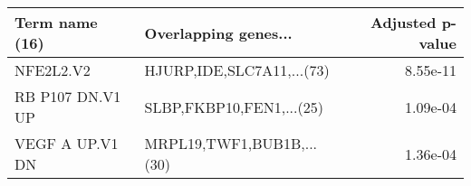 \begin{tabular}{llr}
\toprule
  Term name (16) &      Overlapping genes... &  Adjusted p-value \\
\midrule
       NFE2L2.V2 & HJURP,IDE,SLC7A11,...(73) &          8.55e-11 \\
RB P107 DN.V1 UP &  SLBP,FKBP10,FEN1,...(25) &          1.09e-04 \\
 VEGF A UP.V1 DN & MRPL19,TWF1,BUB1B,...(30) &          1.36e-04 \\
\bottomrule
\end{tabular}
